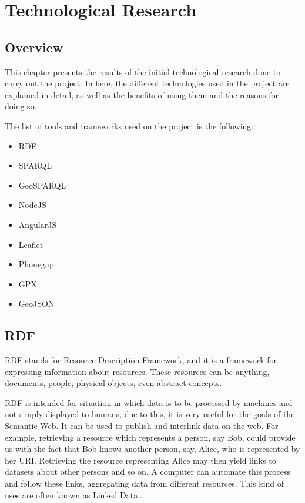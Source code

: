 \chapter{Technological Research}\label{cha:research}

\section{Overview}

This chapter presents the results of the initial technological research done to carry out the project. In here, the different technologies used in the project are explained in detail, as well as the benefits of using them and the reasons for doing so.

The list of tools and frameworks used on the project is the following:

\begin{itemize}
	\item RDF
	\item SPARQL
	\item GeoSPARQL
	\item NodeJS
	\item AngularJS
	\item Leaflet
	\item Phonegap
	\item GPX
	\item GeoJSON
\end{itemize}

\section{RDF}

RDF stands for Resource Description Framework, and it is a framework for expressing information about resources. These resources can be anything, documents, people, physical objects, even abstract concepts.

RDF is intended for situation in which data is to be processed by machines and not simply displayed to humans, due to this, it is very useful for the goals of the Semantic Web. It can be used to publish and interlink data on the web. For example, retrieving a resource which represents a person, say Bob, could provide us with the fact that Bob knows another person, say, Alice, who is represented by her URI. Retrieving the resource representing Alice may then yield links to datasets about other persons and so on. A computer can automate this process and follow these links, aggregating data from different resources. This kind of uses are often known as Linked Data \cite{rdfprimer11}. 

